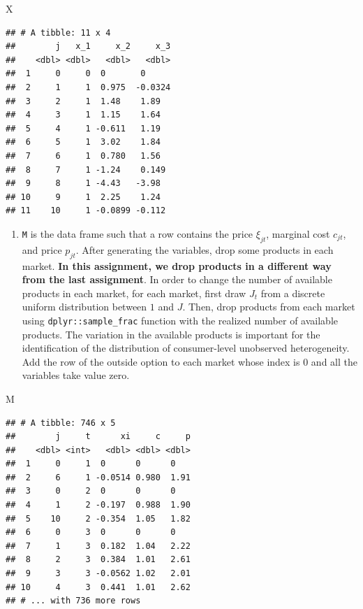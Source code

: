 \documentclass[]{book}
\newenvironment{Shaded}{\begin{snugshade}}{\end{snugshade}}
\newcommand{\NormalTok}[1]{#1}
\providecommand{\tightlist}{%
  \setlength{\itemsep}{0pt}\setlength{\parskip}{0pt}}
\begin{document}
\begin{Shaded}
\begin{Highlighting}[]
\NormalTok{X}
\end{Highlighting}
\end{Shaded}

\begin{verbatim}
## # A tibble: 11 x 4
##        j   x_1     x_2     x_3
##    <dbl> <dbl>   <dbl>   <dbl>
##  1     0     0  0       0     
##  2     1     1  0.975  -0.0324
##  3     2     1  1.48    1.89  
##  4     3     1  1.15    1.64  
##  5     4     1 -0.611   1.19  
##  6     5     1  3.02    1.84  
##  7     6     1  0.780   1.56  
##  8     7     1 -1.24    0.149 
##  9     8     1 -4.43   -3.98  
## 10     9     1  2.25    1.24  
## 11    10     1 -0.0899 -0.112
\end{verbatim}

\begin{enumerate}
\def\labelenumi{\arabic{enumi}.}
\setcounter{enumi}{2}
\tightlist
\item
  \texttt{M} is the data frame such that a row contains the price
  \(\xi_{jt}\), marginal cost \(c_{jt}\), and price \(p_{jt}\). After
  generating the variables, drop some products in each market.
  \textbf{In this assignment, we drop products in a different way from
  the last assignment}. In order to change the number of available
  products in each market, for each market, first draw \(J_t\) from a
  discrete uniform distribution between \(1\) and \(J\). Then, drop
  products from each market using \texttt{dplyr::sample\_frac} function
  with the realized number of available products. The variation in the
  available products is important for the identification of the
  distribution of consumer-level unobserved heterogeneity. Add the row
  of the outside option to each market whose index is \(0\) and all the
  variables take value zero.
\end{enumerate}

\begin{Shaded}
\begin{Highlighting}[]
\NormalTok{M}
\end{Highlighting}
\end{Shaded}

\begin{verbatim}
## # A tibble: 746 x 5
##        j     t      xi     c     p
##    <dbl> <int>   <dbl> <dbl> <dbl>
##  1     0     1  0      0      0   
##  2     6     1 -0.0514 0.980  1.91
##  3     0     2  0      0      0   
##  4     1     2 -0.197  0.988  1.90
##  5    10     2 -0.354  1.05   1.82
##  6     0     3  0      0      0   
##  7     1     3  0.182  1.04   2.22
##  8     2     3  0.384  1.01   2.61
##  9     3     3 -0.0562 1.02   2.01
## 10     4     3  0.441  1.01   2.62
## # ... with 736 more rows
\end{verbatim}
\end{document}
